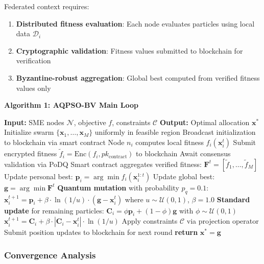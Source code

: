 \documentclass[times,10pt,twocolumn]{jucs2e}
\begin{document}
Federated context requires:
\begin{enumerate}
\item \textbf{Distributed fitness evaluation}: Each node evaluates particles using local data $\mathcal{D}_i$
\item \textbf{Cryptographic validation}: Fitness values submitted to blockchain for verification
\item \textbf{Byzantine-robust aggregation}: Global best computed from verified fitness values only
\end{enumerate}

\textbf{Algorithm 1: AQPSO-BV Main Loop}

\begin{algorithmic}[1]
\STATE \textbf{Input:} SME nodes $\mathcal{N}$, objective $f$, constraints $\mathcal{C}$
\STATE \textbf{Output:} Optimal allocation $\mathbf{x}^*$
\STATE Initialize swarm $\{\mathbf{x}_1, \ldots, \mathbf{x}_M\}$ uniformly in feasible region
\STATE Broadcast initialization to blockchain via smart contract
        \STATE Node $n_i$ computes local fitness $f_i(\mathbf{x}_i^t)$
        \STATE Submit encrypted fitness $\tilde{f}_i = \text{Enc}(f_i, pk_{\text{contract}})$ to blockchain
        \STATE Await consensus validation via PoDQ
    \ENDFOR
    \STATE Smart contract aggregates verified fitness: $\mathbf{F}^t = [\tilde{f}_1, \ldots, \tilde{f}_M]$
    \STATE Update personal best: $\mathbf{p}_i = \arg\min f_i(\mathbf{x}_i^{1:t})$
    \STATE Update global best: $\mathbf{g} = \arg\min \mathbf{F}^t$
    \STATE \textbf{Quantum mutation} with probability $p_q = 0.1$:
        \STATE $\mathbf{x}_i^{t+1} = \mathbf{p}_i + \beta \cdot \ln(1/u) \cdot (\mathbf{g} - \mathbf{x}_i^t)$
        \STATE where $u \sim \mathcal{U}(0,1)$, $\beta = 1.0$
    \ENDFOR
    \STATE \textbf{Standard update} for remaining particles:
    \STATE $\mathbf{C}_i = \phi \mathbf{p}_i + (1-\phi) \mathbf{g}$ with $\phi \sim \mathcal{U}(0,1)$
    \STATE $\mathbf{x}_i^{t+1} = \mathbf{C}_i + \beta \cdot |\mathbf{C}_i - \mathbf{x}_i^t| \cdot \ln(1/u)$
    \STATE Apply constraints $\mathcal{C}$ via projection operator
    \STATE Submit position updates to blockchain for next round
\ENDFOR
\STATE \textbf{return} $\mathbf{x}^* = \mathbf{g}$
\end{algorithmic}

\subsubsection{Convergence Analysis}
\end{document}
